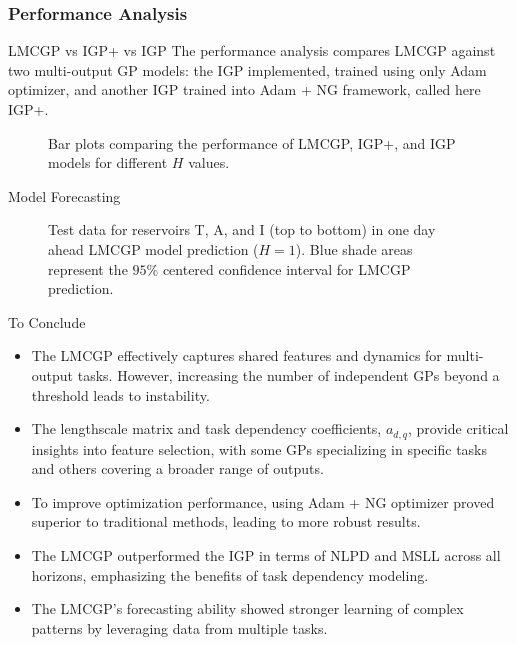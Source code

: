 \subsubsection{Performance Analysis}

\begin{frame}{LMCGP vs IGP+ vs IGP}
The performance analysis compares LMCGP against two multi-output GP models: the IGP implemented, trained using only Adam optimizer, and another IGP trained into Adam + NG framework, called here IGP+.
	\begin{figure}[htbp]
		\centering
		\setlength{}
		\setlength{}
		
		\subfloat[NLPD]{}
		\hfill
		\subfloat[MSLL]{}
		
		\caption{Bar plots comparing the performance of LMCGP, IGP+, and IGP models for different \(H\) values.}
	\end{figure}
\end{frame}

\begin{frame}{Model Forecasting}
	\begin{figure}[htbp]
		\centering
		\setlength\figurewidth{\columnwidth} 
		\setlength{}
		
		\hfill
		\hfill
		
		
		\caption{Test data for reservoirs T, A, and I (top to bottom) in one day ahead LMCGP model prediction ($H=1$). Blue shade areas represent the $95\%$ centered confidence interval for LMCGP prediction.}
	\end{figure}
\end{frame}



\begin{frame}{To Conclude}
	
	\begin{itemize}
		\justifying
		\item The LMCGP effectively captures shared features and dynamics for multi-output tasks. However, increasing the number of independent GPs beyond a threshold leads to instability.
		\item The lengthscale matrix and task dependency coefficients, $a_{d,q}$, provide critical insights into feature selection, with some GPs specializing in specific tasks and others covering a broader range of outputs.
		\item To improve optimization performance, using Adam + NG optimizer proved superior to traditional methods, leading to more robust results.
		\item The LMCGP outperformed the IGP in terms of NLPD and MSLL across all horizons, emphasizing the benefits of task dependency modeling.
		\item The LMCGP's forecasting ability showed stronger learning of complex patterns by leveraging data from multiple tasks.
	\end{itemize}
\end{frame}
